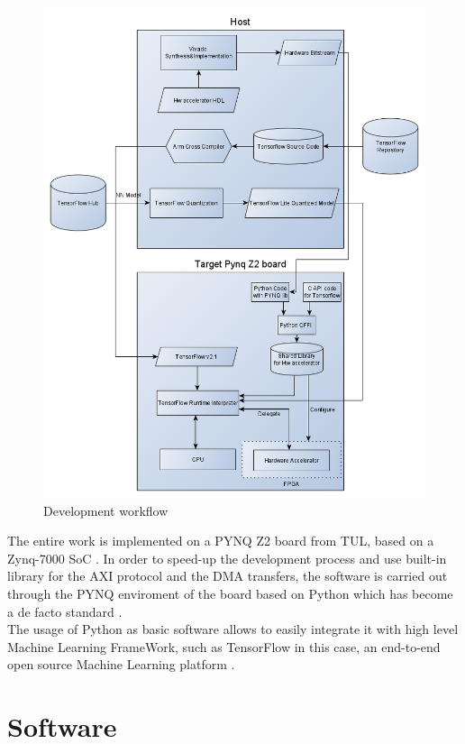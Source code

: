 \begin{figure}[!htbp]
\centering
\captionsetup{justification=centering}
\includegraphics[scale=0.5]{./figure/workflow.png}
\caption{Development workflow}
\label{fig:workflow}
\end{figure}

\newpage
The entire work is implemented on a PYNQ Z2 board from TUL, based on a Zynq-7000 SoC \cite{paper:31}. In order to speed-up the development process and use built-in library for the AXI protocol and the DMA transfers, the software is carried out through the PYNQ enviroment of the board \cite{WEBSITE:2} based on Python which has become a de facto standard \cite{paper:37}. \\
The usage of Python as basic software allows to easily integrate it with high level Machine Learning FrameWork, such as TensorFlow in this case, an end-to-end open source Machine Learning platform \cite{WEBSITE:4}. 
\newpage
\section{Software}

